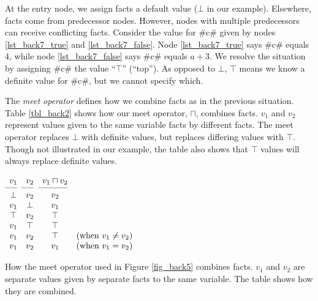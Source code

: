 \documentclass[12pt]{report}
\begin{document}
At the entry node, we assign \inE facts a default value ($\bot$
in our example). Elsewhere, \inE facts come from predecessor
nodes. However, nodes with multiple predecessors can receive
conflicting facts. Consider the value for #c# given by nodes
\ref{lst_back7_true} and \ref{lst_back7_false}. Node
\ref{lst_back7_true} says #c# equals 4, while node
\ref{lst_back7_false} says #c# equals $a + 3$. We resolve the
situation by assigning #c# the value ``$\top$'' (``top''). As opposed
to $\bot$, $\top$ means we know a definite value for #c#, but we
cannot specify which.

The \emph{meet operator} defines how we combine facts as in the
previous situation. Table \ref{tbl_back2} shows how our meet operator,
$\sqcap$, combines facts. $v_1$ and $v_2$ represent values given to
the same variable facts by different facts. The meet operator replaces
$\bot$ with definite values, but replaces differing values with
$\top$. Though not illustrated in our example, the table also shows
that $\top$ values will always replace definite values.

\begin{table}[tbh]
  \centering
  \figbegin
  \begin{math}
    \begin{array}{cccc}
      v_1 & v_2 & v_1 \sqcap v_2 \\
      \cmidrule(r){1-1}\cmidrule(r){2-2}\cmidrule(r){3-3}
      \bot & v_2 & v_2 & \\ 
      v_1 & \bot & v_1 & \\
      \top & v_2 & \top & \\
      v_1 & \top & \top  &\\
      v_1 & v_2 & \top & \text{(when $v_1 \neq v_2$)}\\
      v_1 & v_2 & v_1 & \text{(when $v_1 = v_2$)}
    \end{array}
  \end{math}
  \caption{How the meet operator used in
    Figure \ref{fig_back5} combines facts. $v_1$ and $v_2$ are
    separate values given by separate facts to the same variable. The
    table shows how they are combined.}
  \label{tbl_back2}
  \figend
\end{table}
\end{document}
